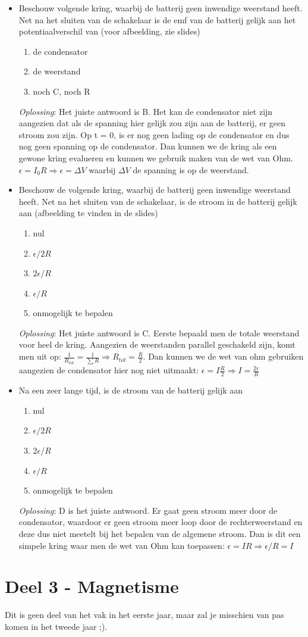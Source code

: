 \documentclass[12pt,a4paper]{article}
\begin{document}
\begin{itemize}
	\item Beschouw volgende kring, waarbij de batterij geen inwendige weerstand heeft. Net na het sluiten van de schakelaar is de emf van de batterij gelijk aan het potentiaalverschil van (voor afbeelding, zie slides)
	\begin{enumerate}[label=\alph*]
		\item de condensator
		\item de weerstand
		\item noch C, noch R
	\end{enumerate}
	\textit{Oplossing}: Het juiste antwoord is B. Het kan de condensator niet zijn aangezien dat als de spanning hier gelijk zou zijn aan de batterij, er geen stroom zou zijn. Op t = 0, is er nog geen lading op de condensator en dus nog geen spanning op de condensator. Dan kunnen we de kring als een gewone kring evalueren en kunnen we gebruik maken van de wet van Ohm. \(\epsilon = I_0R \Rightarrow \epsilon = \Delta V\) waarbij $\Delta V$ de spanning is op de weerstand. 
	\item Beschouw de volgende kring, waarbij de batterij geen inwendige weerstand heeft. Net na het sluiten van de schakelaar, is de stroom in de batterij gelijk aan (afbeelding te vinden in de slides)
	\begin{enumerate}[label=\alph*]
		\item nul
		\item $\epsilon/2R$
		\item $2\epsilon/R$
		\item $\epsilon/R$
		\item onmogelijk te bepalen
	\end{enumerate}
	\textit{Oplossing}: Het juiste antwoord is C. Eerste bepaald men de totale weerstand voor heel de kring. Aangezien de weerstanden parallel geschakeld zijn, komt men uit op: \(\frac{1}{R_{tot}} = \frac{1}{\sum R} \Rightarrow R_{tot} = \frac{R}{2}\). Dan kunnen we de wet van ohm gebruiken aangezien de condensator hier nog niet uitmaakt: \(\epsilon = I\frac{R}{2} \Rightarrow I = \frac{2\epsilon}{R}\)
	\item Na een zeer lange tijd, is de stroom van de batterij gelijk aan
	\begin{enumerate}[label=\alph*]
		\item nul
		\item $\epsilon/2R$
		\item $2\epsilon/R$
		\item $\epsilon/R$
		\item onmogelijk te bepalen
	\end{enumerate}
	\textit{Oplossing}: D is het juiste antwoord. Er gaat geen stroom meer door de condensator, waardoor er geen stroom meer loop door de rechterweerstand en deze dus niet meetelt bij het bepalen van de algemene stroom. Dan is dit een simpele kring waar men de wet van Ohm kan toepassen: \(\epsilon = IR \Rightarrow \epsilon/R = I\)
	\end{itemize}
    \newpage

    \section{Deel 3 - Magnetisme}
    Dit is geen deel van het vak in het eerste jaar, maar zal je misschien van pas komen in het tweede jaar ;).
\end{document}
